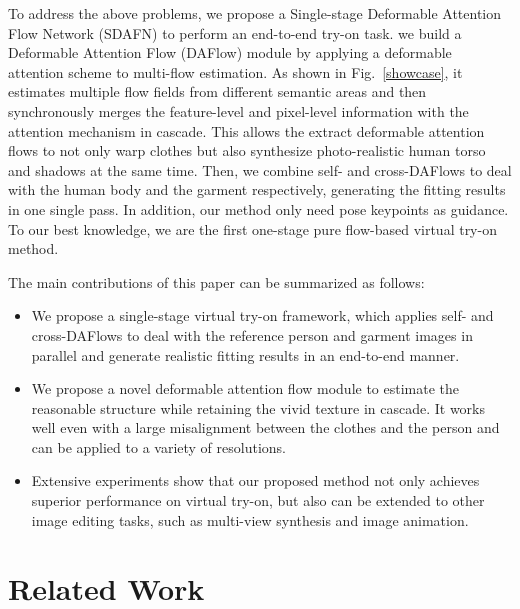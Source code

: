 \documentclass[runningheads]{llncs}
\begin{document}
To address the above problems, we propose a Single-stage Deformable Attention Flow Network (SDAFN) to perform an end-to-end try-on task. we build a Deformable Attention Flow (DAFlow) module by applying a deformable attention scheme to multi-flow estimation. As shown in Fig.~\ref{showcase}, it estimates multiple flow fields from different semantic areas and then synchronously merges the feature-level and pixel-level information with the attention mechanism in cascade. This allows the extract deformable attention flows to not only warp clothes but also synthesize photo-realistic human torso and shadows at the same time. Then, we combine self- and cross-DAFlows to deal with the human body and the garment respectively, generating the fitting results in one single pass. In addition, our method only need pose keypoints as guidance. To our best knowledge, we are the first one-stage pure flow-based virtual try-on method.


The main contributions of this paper can be summarized as follows:

\begin{itemize}
    \item We propose a single-stage virtual try-on framework, which applies self- and cross-DAFlows to deal with the reference person and garment images in parallel and generate realistic fitting results in an end-to-end manner.
    \item We propose a novel deformable attention flow module to estimate the reasonable structure while retaining the vivid texture in cascade. It works well even with a large misalignment between the clothes and the person and can be applied to a variety of resolutions.
    \item Extensive experiments show that our proposed method not only achieves superior performance on virtual try-on, but also can be extended to other image editing tasks, such as multi-view synthesis and image animation.
\end{itemize}


\section{Related Work}
\end{document}
